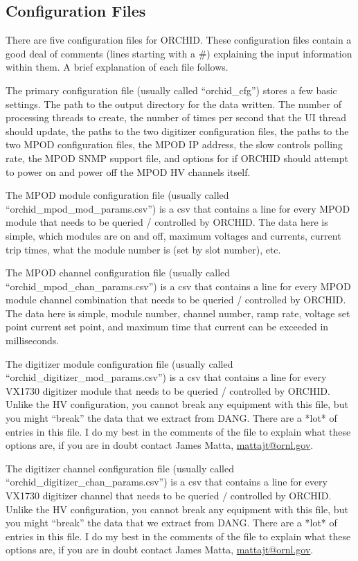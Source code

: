 \documentclass[onecolumn, 10pt, letterpaper, twoside]{article}
\begin{document}
\subsection{Configuration Files}
There are five configuration files for ORCHID. These configuration files contain a good deal of comments (lines starting with a \#) explaining the input information within them. A brief explanation of each file follows.

The primary configuration file (usually called ``orchid\_cfg'') stores a few basic settings. The path to the output directory for the data written. The number of processing threads to create, the number of times per second that the UI thread should update, the paths to the two digitizer configuration files, the paths to the two MPOD configuration files, the MPOD IP address, the slow controls polling rate, the MPOD SNMP support file, and options for if ORCHID should attempt to power on and power off the MPOD HV channels itself.

The MPOD module configuration file (usually called ``orchid\_mpod\_mod\_params.csv'') is a csv that contains a line for every MPOD module that needs to be queried / controlled by ORCHID. The data here is simple, which modules are on and off, maximum voltages and currents, current trip times, what the module number is (set by slot number), etc.

The MPOD channel configuration file (usually called ``orchid\_mpod\_chan\_params.csv'') is a csv that contains a line for every MPOD module channel combination that needs to be queried / controlled by ORCHID. The data here is simple, module number, channel number, ramp rate, voltage set point current set point, and maximum time that current can be exceeded in milliseconds.

The digitizer module configuration file (usually called ``orchid\_digitizer\_mod\_params.csv'') is a csv that contains a line for every VX1730 digitizer module that needs to be queried / controlled by ORCHID. Unlike the HV configuration, you cannot break any equipment with this file, but you might ``break'' the data that we extract from DANG. There are a *lot* of entries in this file. I do my best in the comments of the file to explain what these options are, if you are in doubt contact James Matta, \href{mailto:mattajt@ornl.gov}{mattajt@ornl.gov}.

The digitizer channel configuration file (usually called ``orchid\_digitizer\_chan\_params.csv'') is a csv that contains a line for every VX1730 digitizer channel that needs to be queried / controlled by ORCHID. Unlike the HV configuration, you cannot break any equipment with this file, but you might ``break'' the data that we extract from DANG. There are a *lot* of entries in this file. I do my best in the comments of the file to explain what these options are, if you are in doubt contact James Matta, \href{mailto:mattajt@ornl.gov}{mattajt@ornl.gov}.
\end{document}
